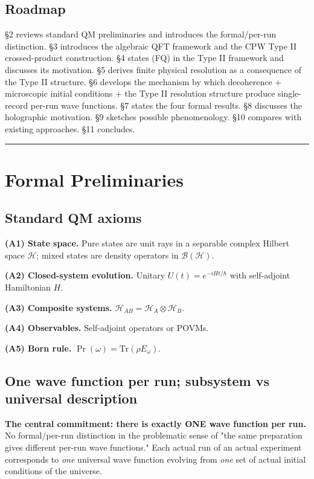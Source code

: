 \documentclass[11pt,a4paper]{article}
\begin{document}
\subsection{Roadmap}

§2 reviews standard QM preliminaries and introduces the formal/per-run distinction. §3 introduces the algebraic QFT framework and the CPW Type II crossed-product construction. §4 states (FQ) in the Type II framework and discusses its motivation. §5 derives finite physical resolution as a consequence of the Type II structure. §6 develops the mechanism by which decoherence + microscopic initial conditions + the Type II resolution structure produce single-record per-run wave functions. §7 states the four formal results. §8 discusses the holographic motivation. §9 sketches possible phenomenology. §10 compares with existing approaches. §11 concludes.

\medskip\hrule\medskip

\section{Formal Preliminaries}

\subsection{Standard QM axioms}

\textbf{(A1) State space.} Pure states are unit rays in a separable complex Hilbert space $\mathcal{H}$; mixed states are density operators in $\mathcal{B}(\mathcal{H})$.

\textbf{(A2) Closed-system evolution.} Unitary $U(t) = e^{-iHt/\hbar}$ with self-adjoint Hamiltonian $H$.

\textbf{(A3) Composite systems.} $\mathcal{H}_{AB} = \mathcal{H}_A \otimes \mathcal{H}_B$.

\textbf{(A4) Observables.} Self-adjoint operators or POVMs.

\textbf{(A5) Born rule.} $\Pr(\omega) = \mathrm{Tr}(\rho E_\omega)$.

\subsection{One wave function per run; subsystem vs universal description}

\textbf{The central commitment: there is exactly ONE wave function per run.} No formal/per-run distinction in the problematic sense of "the same preparation gives different per-run wave functions." Each actual run of an actual experiment corresponds to \emph{one} universal wave function evolving from \emph{one} set of actual initial conditions of the universe.
\end{document}
